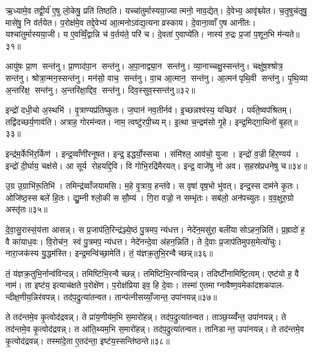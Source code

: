 ऋ॒ध्यामे॒व तद्वी॒र्य॑ ए॒षु लो॒केषु॒ प्रति॑ तिष्ठति। यच्चा॑तुर्मास्यया॒ज्यात्मनो॒ नाव॒द्येत्। दे॒वेभ्य॒ आवृ॑श्च्येत। च॒तृ॒षुच॑तृषु॒ मासे॑षु॒ नि व॑र्तयेत। प॒रोक्ष॑मे॒व तद्दे॒वेभ्य॑ आ॒त्मनोऽव॑द्य॒त्यनाव्रस्काय। दे॒वाना॒व्वाँ ए॒ष आनी॑तः। यश्चा॑तुर्मास्यया॒जी। य ए॒वव्विँ॒द्वान्नि च॑ व॒र्तय॑ते॒ परि॑ च। दे॒वता॑ ए॒वाप्ये॑ति। नास्य॑ रु॒द्रः प्र॒जां प॒शून॒भि म॑न्यते॥३१॥\anuvakamend[ए॒त्ये॒त्य॒यु॒ञ्ज॒तासु॑रा एति लो॒का म॑न्यते]

आयु॑षः प्रा॒ण सन्त॑नु। प्रा॒णाद॑पा॒न सन्त॑नु। अ॒पा॒नाद्व्या॒न सन्त॑नु। व्या॒नाच्चक्षु॒स्सन्त॑नु। चक्षु॑ष॒श्श्रोत्र॒ सन्त॑नु। श्रोत्रा॒न्मन॒स्सन्त॑नु। मन॑सो॒ वाच॒ सन्त॑नु। वा॒च आ॒त्मान॒ सन्त॑नु। आ॒त्मन॑पृथि॒वी सन्त॑नु। पृ॒थि॒व्या अ॒न्तरि॑क्ष॒ सन्त॑नु। अ॒न्तरि॑क्षा॒द्दिव॒ सन्त॑नु। दिव॒स्सुव॒स्सन्त॑नु॥३२॥\anuvakamend[अ॒न्तरि॑क्ष॒ सन्त॑नु॒ द्वे च॑]

इन्द्रो॑ दधी॒चो अ॒स्थभि॑। वृ॒त्राण्यप्र॑तिष्कुतः। ज॒घान॑ नव॒तीर्नव॑। इ॒च्छन्नश्व॑स्य॒ यच्छिर॑। पर्व॑ते॒ष्वप॑श्रितम्। तद्वि॑दच्छर्य॒णाव॑ति। अत्राह॒ गोरम॑न्वत। नाम॒ त्वष्टु॑रपी॒च्यम्। इ॒त्था च॒न्द्रम॑सो गृ॒हे। इन्द्र॒मिद्गा॒थिनो॑ बृ॒हत्॥३३॥

इन्द्र॑म॒र्केभि॑र॒र्किण॑। इन्द्र॒व्वाँणी॑रनूषत। इन्द्र॒ इद्धर्यो॒स्सचा। संमि॑श्ल॒ आव॑चो॒ युजा। इन्द्रो॑ व॒ज्री हि॑र॒ण्यय॑। इन्द्रो॑ दी॒र्घाय॒ चक्ष॑से। आ सूर्य रोहयद्दि॒वि। वि गोभि॒रद्रि॑मैरयत्। इन्द्र॒ वाजे॑षु नो अव। स॒हस्र॑प्रधनेषु च॥३४॥

उ॒ग्र उ॒ग्राभि॑रू॒तिभि॑। तमिन्द्र॑व्वाँजयामसि। म॒हे वृ॒त्राय॒ हन्त॑वे। स वृषा॑ वृष॒भो भु॑वत्। इन्द्र॒स्स दाम॑ने कृ॒तः। ओजि॑ष्ठ॒स्स बले॑ हि॒तः। द्यु॒म्नी श्लो॒की स सौ॒म्य॑। गि॒रा वज्रो॒ न सम्भृ॑तः। सब॑लो॒ अन॑पच्युतः। व॒व॒क्षुरु॒ग्रो अस्तृ॑तः॥३५॥\anuvakamend[बृ॒हच्चास्तृ॑तः]

दे॒वा॒सु॒रास्सं॒य॑त्ता आसन्न्। स प्र॒जाप॑ति॒रिन्द्र॑ञ्ज्ये॒ष्ठं पु॒त्रमप॒ न्य॑धत्त। नेदे॑न॒मसु॑रा॒ बली॑यासोऽहन॒न्निति॑। प्र॒ह्रादो॑ ह॒ वै का॑याध॒वः। वि॒रोच॑न॒ स्वं पु॒त्रमप॒ न्य॑धत्त। नेदे॑नन्दे॒वा अ॑हन॒न्निति॑। ते दे॒वाः प्र॒जाप॑तिमुपस॒मेत्यो॑चुः। नारा॒जक॑स्य यु॒द्धम॑स्ति। इन्द्र॒मन्वि॑च्छा॒मेति॑। तं॒ य॑ज्ञक्र॒तुभि॒रन्वैच्छन्न्॥३६॥

तं॒ य॑ज्ञक्र॒तुभि॒र्नान्व॑विन्दन्न्। तमिष्टि॑भि॒रन्वैच्छन्न्। तमिष्टि॑भि॒रन्व॑विन्दन्न्। तदिष्टी॑नामिष्टि॒त्वम्। एष्ट॑यो ह॒ वै नाम॑। ता इष्ट॑य॒ इत्याच॑क्षते प॒रोक्षे॑ण। प॒रोक्ष॑प्रिया इव॒ हि दे॒वाः। तस्मा॑ ए॒तमाग्नावैष्ण॒वमेका॑दशकपाल- न्दीक्ष॒णीय॒न्निर॑वपन्न्। तद॑प॒द्रुत्या॑तन्वत। तान्प॑त्नीसय्याँ॒जान्त॒ उपा॑नयन्न्॥३७॥

ते तद॑न्तमे॒व कृ॒त्वोद॑द्रवन्न्। ते प्रा॑य॒णीय॑म॒भि स॒मारो॑हन्न्। तद॑प॒द्रुत्या॑तन्वत। ताञ्छ॒य्य्वँ॑न्त॒ उपा॑नयन्न्। ते तद॑न्तमे॒व कृ॒त्वोद॑द्रवन्न्। त आ॑ति॒थ्यम॒भि स॒मारो॑हन्न्। तद॑प॒द्रुत्या॑तन्वत। तानिडान्त॒ उपा॑नयन्न्। ते तद॑न्तमे॒व कृ॒त्वोद॑द्रवन्न्। तस्मा॑दे॒ता ए॒तद॑न्ता॒ इष्ट॑य॒स्सन्ति॑ष्ठन्ते॥३८॥

